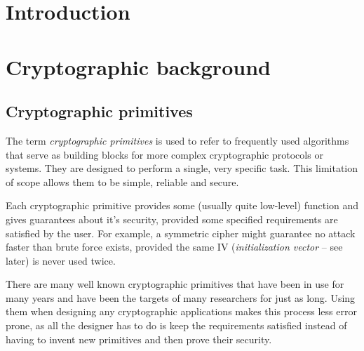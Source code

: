\chapter{Introduction}


\chapter{Cryptographic background}


\section{Cryptographic primitives}

The term \emph{cryptographic primitives} is used to refer to frequently used algorithms that serve as building blocks for more complex cryptographic protocols or systems.
They are designed to perform a single, very specific task.
This limitation of scope allows them to be simple, reliable and secure.

Each cryptographic primitive provides some (usually quite low-level) function and gives guarantees about it's security, provided some specified requirements are satisfied by the user. 
For example, a symmetric cipher might guarantee no attack faster than brute force exists, provided the same IV (\emph{initialization vector} -- see later) is never used twice.

There are many well known cryptographic primitives that have been in use for many years and have been the targets of many researchers for just as long.
Using them when designing any cryptographic applications makes this process less error prone, as all the designer has to do is keep the requirements satisfied instead of having to invent new primitives and then prove their security.

